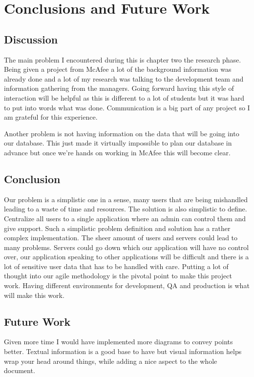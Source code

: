\chapter{Conclusions and Future Work}
\label{chap:conclusions}

\section{Discussion}
The main problem I encountered during this is chapter two the research phase. Being given a project from McAfee a lot of the background information was already done and a lot of my research was talking to the development team and information gathering from the managers. Going forward having this style of interaction will be helpful as this is different to a lot of students but it was hard to put into words what was done. Communication is a big part of any project so I am grateful for this experience. 

Another problem is not having information on the data that will be going into our database. This just made it virtually impossible to plan our database in advance but once we're hands on working in McAfee this will become clear. 

\section{Conclusion}
Our problem is a simplistic one in a sense, many users that are being mishandled leading to a waste of time and resources. The solution is also simplistic to define. Centralize all users to a single application where an admin can control them and give support. Such a simplistic problem definition and solution has a rather complex implementation. The sheer amount of users and servers could lead to many problems. Servers could go down which our application will have no control over, our application speaking to other applications will be difficult and there is a lot of sensitive user data that has to be handled with care. Putting a lot of thought into our agile methodology is the pivotal point to make this project work. Having different environments for development, QA and production is what will make this work. 

\section{Future Work}
Given more time I would have implemented more diagrams to convey points better. Textual information is a good base to have but visual information helps wrap your head around things, while adding a nice aspect to the whole document. 